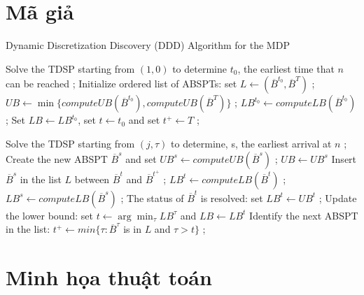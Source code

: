 \documentclass[../main.tex]{subfiles}
\begin{document}
\section{Mã giả}\label{muxe3-giux1ea3}

\begin{algorithm}[H]

\caption{Dynamic Discretization Discovery (DDD) Algorithm for the MDP}
\label{algo:1}
\begin{algorithmic}

\State Solve the TDSP starting from $(1, 0)$ to determine $t_0$, the earliest time that $n$ can be reached ;
\State Initialize ordered list of ABSPTs: set $L \leftarrow (\overline{B}^{t_0}, \overline{B}^{T})$  ;
\State $UB \leftarrow \min\{ computeUB(\overline{B}^{t_0}), computeUB(\overline{B}^{T})\}$ ;
\State $LB^{t_0} \leftarrow computeLB(\overline{B}^{t_0})$ ;
\State Set $LB \leftarrow LB^{t_0}$, set $t \leftarrow t_0$ and set $t^+ \leftarrow T$ ;

        \State Solve the TDSP starting from $(j, \tau)$ to determine, s, the earliest arrival at $n$ ;
        \State Create the new ABSPT $\overline{B}^s$ and set $UB^s \leftarrow computeUB(\overline{B}^s)$ ;
            \State $UB \leftarrow UB^s$
        \EndIf
        \State Insert $\overline{B}^s$ in the list $L$ between $\overline{B}^t$ and $\overline{B}^{t^+}$ ;
        \State $LB^t \leftarrow computeLB(\overline{B}^t)$ ;
        \State $LB^s \leftarrow computeLB(\overline{B}^s)$ ;
    \Else
        \State The status of $\overline{B}^t$ is resolved: set $LB^t \leftarrow UB^t$ ;
    \EndIf
    \State Update the lower bound: set $t \leftarrow \arg\min_{\tau}LB^{\tau}$ and $LB\leftarrow LB^t$ 
    \State Identify the next ABSPT in the list: $t^+ \leftarrow min\{\tau : \overline{B}^{\tau}$ is in $L$ and $\tau > t \}$ ;
\EndWhile
  
  \end{algorithmic}
\end{algorithm}

\section{Minh họa thuật toán}\label{minh-houx1ea1-thuux1eadt-touxe1n}
\end{document}
